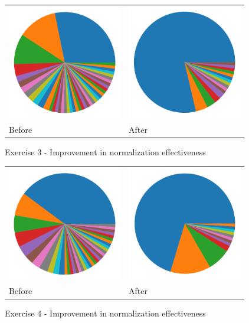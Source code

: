 \begin{figure}
\centering
\begin{tabular}{ >{\centering\arraybackslash}m{14em} >{\centering\arraybackslash}m{14em} }
\includegraphics[height=5cm]{graphs/cluster-baseline-3.png}
&
\includegraphics[height=5cm]{graphs/cluster-aggressive-3.png} \\
Before & After
\end{tabular}
\caption{Exercise 3 - Improvement in normalization effectiveness}
\label{fig:improvements-clusters-3}
\end{figure}

\begin{figure}
\centering
\begin{tabular}{ >{\centering\arraybackslash}m{14em} >{\centering\arraybackslash}m{14em} }
\includegraphics[height=5cm]{graphs/cluster-baseline-4.png}
&
\includegraphics[height=5cm]{graphs/cluster-aggressive-4.png} \\
Before & After
\end{tabular}
\caption{Exercise 4 - Improvement in normalization effectiveness}
\label{fig:improvements-clusters-4}
\end{figure}

